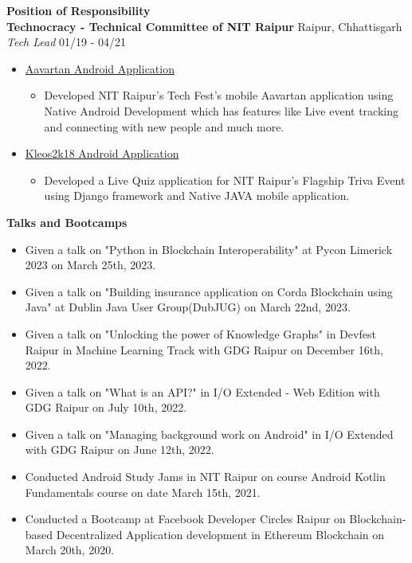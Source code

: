 \documentclass{article}
\begin{document}
\vspace{10pt}
\noindent \large \textbf{\textcolor{NavyBlue}{Position of Responsibility}} \vspace{5pt} \\
\noindent \normalsize \textbf{Technocracy - Technical Committee of NIT Raipur} \hfill Raipur, Chhattisgarh \\
\noindent \normalsize \textit{Tech Lead} \hfill 01/19 - 04/21
\begin{itemize}[noitemsep,nolistsep,leftmargin=*]
    \item {\href{https://bit.ly/aavartan}{Aavartan Android Application}
        \begin{itemize}
            \item Developed NIT Raipur's Tech Fest's mobile Aavartan application using Native Android Development which has features like Live event tracking and connecting with new people and much more.
        \end{itemize}
    }
    \item {\href{https://bit.ly/kleos2k18}{Kleos2k18 Android Application}
        \begin{itemize}
            \item Developed a Live Quiz application for NIT Raipur's Flagship Triva Event using Django framework and Native JAVA mobile application.
        \end{itemize}
    }
\end{itemize}
\noindent \large \textbf{\textcolor{NavyBlue}{Talks and Bootcamps}}
\begin{itemize}[noitemsep,nolistsep,leftmargin=*]
    \item { \normalsize Given a talk on "Python in Blockchain Interoperability" at Pycon Limerick 2023 on March 25th, 2023.}
    \item { \normalsize Given a talk on "Building insurance application on Corda Blockchain using Java" at Dublin Java User Group(DubJUG) on March 22nd, 2023.}
    \item { \normalsize Given a talk on "Unlocking the power of Knowledge Graphs" in Devfest Raipur in Machine Learning Track with GDG Raipur on December 16th, 2022.  }
    \item { \normalsize Given a talk on "What is an API?" in I/O Extended - Web Edition with GDG Raipur on July 10th, 2022.  }
    \item { \normalsize Given a talk on "Managing background work on Android" in I/O Extended with GDG Raipur on June 12th, 2022.  }
    \item { \normalsize Conducted Android Study Jams in NIT Raipur on course Android Kotlin Fundamentals course on date March 15th, 2021. }
    \item { \normalsize Conducted a Bootcamp at Facebook Developer Circles Raipur on Blockchain-based Decentralized Application development in Ethereum Blockchain on March 20th, 2020. }
\end{itemize}
\end{document}
